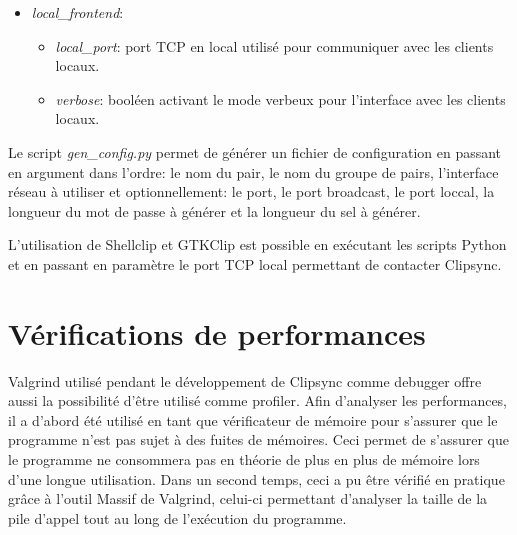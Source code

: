 \begin{itemize}
\begin{itemize}
    être copiées sur les autres pairs.
  \item \emph{keepalive\_delay}: délai en millisecondes après lequel la
    connexion est fermée si aucun message OK n'est reçu.
  \item \emph{keepalive\_interval}: interval en millisecondes utilisé pour
    l'envoi de messages OK.
  \item \emph{verbose}, \emph{verbose\_bcast}, \emph{verbose\_peer}:
    booléens permettant d'activer ou de désactiver le mode verbeux
    \footnote{Le mode verbeux permet d'afficher sur la sortie standard
    des informations sur l'activité du logiciel.} de Clipsync.
  \end{itemize}
\item \emph{local\_frontend}:
  \begin{itemize}
  \item \emph{local\_port}: port TCP en local utilisé pour communiquer avec les
    clients locaux.
  \item \emph{verbose}: booléen activant le mode verbeux pour l'interface avec
    les clients locaux.
  \end{itemize}
\end{itemize}

Le script \emph{gen\_config.py} permet de générer un fichier de configuration
en passant en argument dans l'ordre: le nom du pair, le nom du groupe de pairs,
l'interface réseau à utiliser et optionnellement: le port, le port broadcast,
le port loccal, la longueur du mot de passe à générer et la longueur du
sel à générer.

L'utilisation de Shellclip et GTKClip est possible en exécutant les scripts
Python et en passant en paramètre le port TCP local permettant de contacter
Clipsync.

\section{Vérifications de performances}
Valgrind utilisé pendant le développement de Clipsync comme debugger
offre aussi la possibilité d'être utilisé comme profiler. Afin d'analyser
les performances, il a d'abord été utilisé en tant que vérificateur
de mémoire pour s'assurer que le programme n'est pas sujet à des fuites
de mémoires. Ceci permet de s'assurer que le programme ne consommera pas
en théorie de plus en plus de mémoire lors d'une longue utilisation.
Dans un second temps, ceci a pu être vérifié en pratique grâce à l'outil
Massif de Valgrind, celui-ci permettant d'analyser la taille de la pile
d'appel tout au long de l'exécution du programme.

